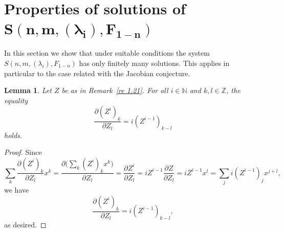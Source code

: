 \documentclass[reqno,a4paper]{amsart}
\newtheorem{lemma}[theorem]{Lemma}
\theoremstyle{definition}
\theoremstyle{remark}
\begin{document}
\section[Properties of solutions of $S(n,m,(\lambda_i),F_{1-n})$]{Properties of solutions of
$\bm{S(n,m,(\lambda_i),F_{1-n})}$}
%
In this section we show that under suitable conditions the system~$S(n,m,(\lambda_i),F_{1-n})$
has only finitely many solutions. This applies in particular to the case related with the
Jacobian conjecture.

\setcounter{equation}{0}

\begin{lemma} Let $Z$ be as in Remark~\ref{re 1.21}. For all $i\in \mathds{N}$ and
$k,l\in \mathds{Z}$, the equality
$$
\frac{\partial (Z^i)_{k}}{\partial Z_l}=i (Z^{i-1})_{k-l}
$$
holds.
\end{lemma}

\begin{proof} Since
$$
\sum_k \frac{\partial (Z^i)_k}{\partial Z_l} x^k=\frac{\partial \bigl(\sum_k (Z^i)_k x^k\bigr)}{\partial Z_l}=
 \frac{\partial Z^i}{\partial Z_l}=i Z^{i-1}\frac{\partial Z}{\partial Z_l}=i Z^{i-1}x^l= \sum_j i(Z^{i-1})_j
 x^{j+l},
$$
we have
$$
\frac{\partial (Z^i)_{k}}{\partial Z_l}=i (Z^{i-1})_{k-l},
$$
as desired.
\end{proof}
\end{document}
